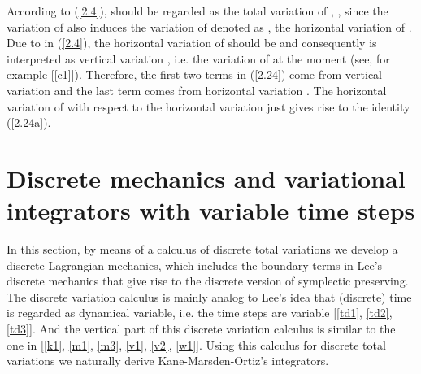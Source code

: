 \documentclass[a4paper,a4paper]{article}
\def\sect#1{\section{#1}\setcounter{equation}{0}}
\begin{document}
According to (\ref{2.4}), \coordHE{} should be regarded
as the total variation of \coordHE{}, \coordHE{}, since the variation of \coordHE{} also induces the
variation of \coordHE{} denoted as \coordHE{}, the horizontal
variation of \coordHE{}. Due to \coordHE{} in (\ref{2.4}), the
horizontal variation of \coordHE{} should be  \coordHE{} and consequently \coordHE{} is interpreted
as vertical variation \coordHE{}, i.e. the variation of
\coordHE{}
at the moment \coordHE{} (see, for example [\ref{c1}]). %
Therefore, the first two terms in (\ref{2.24}) come from vertical
variation \coordHE{} and the last term comes from horizontal
variation \coordHE{}.  The horizontal variation of \coordHE{} with
respect to the horizontal variation  \coordHE{}
just gives rise to the identity (\ref{2.24a}).



\vskip5pt
\sect{Discrete mechanics and variational integrators with variable
time steps }

 In this section, by means of a calculus of discrete total variations we develop
 a discrete Lagrangian mechanics, which includes the boundary terms in Lee's
discrete mechanics that give rise to the discrete version of
symplectic preserving. The discrete variation calculus is mainly
analog to Lee's idea that (discrete) time is regarded as dynamical
variable, i.e. the time steps are variable [\ref{td1}, \ref{td2},
\ref{td3}]. And the vertical part of this discrete variation
calculus is similar to the one in [\ref{k1}, \ref{m1}, \ref{m3},
\ref{v1}, \ref{v2}, \ref{w1}]. %
Using this calculus
for discrete total  variations
we  naturally derive
 Kane-Marsden-Ortiz's integrators.
\end{document}
